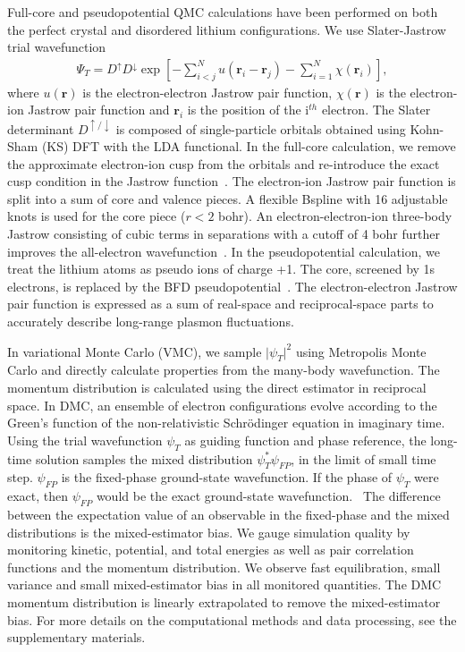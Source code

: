 \documentclass[aps,prb,showpacs,preprintnumbers,amsmath,amssymb,superscriptaddress,twocolumn]{revtex4-1}
\newcommand{\bs}{\boldsymbol}
\newcommand{\up}{\uparrow}
\newcommand{\down}{\downarrow}
\begin{document}
Full-core and pseudopotential QMC calculations have been performed on both  the perfect crystal and disordered lithium configurations. %
We use Slater-Jastrow trial wavefunction
\begin{align}
\Psi_T = D^{\up} D^{\down} \exp\left[ -\sum\limits_{i<j}^{N} u(\bs{r}_i-\bs{r}_j) - \sum\limits_{i=1}^N \chi(\bs{r}_i) \right],\label{eq:sj}
\end{align}
where $u(\bs{r})$ is the electron-electron Jastrow pair function, $\chi(\bs{r})$ is the electron-ion Jastrow pair function and $\bs{r}_i$ is the position of the i$^{th}$ electron. The Slater determinant $D^{\up/\down}$ is composed of single-particle orbitals obtained using Kohn-Sham (KS) DFT with the LDA functional. In the full-core calculation, we remove the approximate electron-ion cusp from the orbitals and re-introduce the exact cusp condition in the Jastrow function~\cite{Ceperley1981}. The electron-ion Jastrow pair function is split into a sum of core and valence pieces. A flexible Bspline with 16 adjustable knots is used for the core piece ($r<2$ bohr). An electron-electron-ion three-body Jastrow consisting of cubic terms in separations with a cutoff of 4 bohr further improves the all-electron wavefunction~\cite{Vincent2007}. In the pseudopotential calculation, we treat the lithium atoms as pseudo ions of charge +1. The core, screened by 1s electrons, is replaced by the BFD pseudopotential~\cite{Burkatzki2007}.  The electron-electron Jastrow pair function is expressed as a sum of real-space and reciprocal-space parts to accurately describe long-range plasmon fluctuations.

In variational Monte Carlo (VMC), we sample $\vert \psi_T \vert^2$ using Metropolis Monte Carlo and directly calculate properties from the many-body wavefunction. The momentum distribution is calculated using the direct estimator in reciprocal space\cite{McMillan1965}. In DMC, an ensemble of electron configurations evolve according to the Green's function of the non-relativistic Schr\"odinger equation in imaginary time. Using the trial wavefunction $\psi_T$ as guiding function and phase reference, the long-time solution samples the mixed distribution $\psi^*_T\psi_{FP}$, in the limit of small time step. $\psi_{FP}$ is the fixed-phase ground-state wavefunction. If the phase of $\psi_T$ were exact, then $\psi_{FP}$ would be the exact ground-state wavefunction.~\cite{Ortiz1993} The difference between the expectation value of an observable in the fixed-phase and the mixed distributions is the mixed-estimator bias. We gauge simulation quality by monitoring kinetic, potential, and total energies as well as pair correlation functions and the momentum distribution. We observe fast equilibration, small variance and small mixed-estimator bias in all monitored quantities. The DMC momentum distribution is linearly extrapolated to remove the mixed-estimator bias. For more details on the computational methods and data processing, see the supplementary materials.
\end{document}
